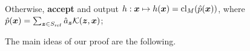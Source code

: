 \documentclass[11pt]{article} %
\numberwithin{equation}{section}
\begin{document}
\begin{algorithm}[t]
\begin{align*}
\end{align*}
Otherwise, \textbf{accept} and output $h: {\bm{x}} \mapsto h({\bm{x}}) = \mathrm{cl}_M(\hat p({\bm{x}}))$, where $\hat p({\bm{x}}) = \sum_{{\bm{z}}\in S_{\mathrm{ref}}} \hat{a}_{{\bm{z}}}\mathcal{K}({\bm{z}},{\bm{x}})$;
\end{algorithm}%
The main ideas of our proof are the following.
\end{document}
